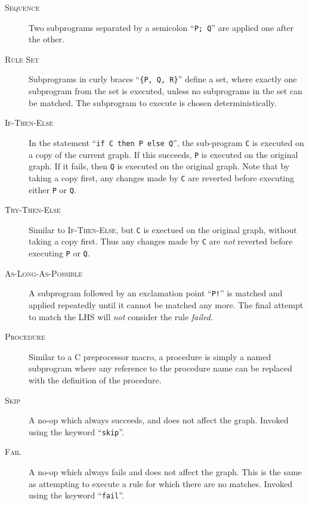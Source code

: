 \documentclass[authoryearcitations]{UoYCSproject}
\begin{document}
\begin{description}
    \item[\textsc{Sequence}]
    Two subprograms separated by a semicolon ``\texttt{P; Q}'' are applied
    one after the other.

    \item[\textsc{Rule Set}]
    Subprograms in curly braces ``\texttt{\{P, Q, R\}}'' define a set, where
    exactly one subprogram from the set is executed, unless no subprograms in
    the set can be matched. The subprogram to execute is chosen deterministically.

    \item[\textsc{If-Then-Else}]
    In the statement ``\texttt{if C then P else Q}'', the sub-program \texttt{C}
    is executed on a copy of the current graph. If this succeeds, \texttt{P} is
    executed on the original graph. If it fails, then \texttt{Q} is executed on
    the original graph. Note that by taking a copy first, any changes made by
    \texttt{C} are reverted before executing either \texttt{P} or \texttt{Q}.

    \item[\textsc{Try-Then-Else}]
    Similar to \textsc{If-Then-Else}, but \texttt{C} is exectued on the original
    graph, without taking a copy first. Thus any changes made by \texttt{C} are
    \emph{not} reverted before executing \texttt{P} or \texttt{Q}.

    \item[\textsc{As-Long-As-Possible}]
    A subprogram followed by an exclamation point ``\texttt{P!}'' is matched and
    applied repeatedly until it cannot be matched any more. The final attempt to
    match the LHS will \emph{not} consider the rule \emph{failed}.

    \item[\textsc{Procedure}]
    Similar to a C preprocessor macro, a procedure is simply a named subprogram
    where any reference to the procedure name can be replaced with the definition
    of the procedure.

    \item[\textsc{Skip}]
    A no-op which always succeeds, and does not affect the graph. Invoked using the
    keyword ``\texttt{skip}''.

    \item[\textsc{Fail}]
    A no-op which always fails and does not affect the graph. This is the same as
    attempting to execute a rule for which there are no matches. Invoked using
    the keyword ``\texttt{fail}''.
\end{description}
\end{document}
